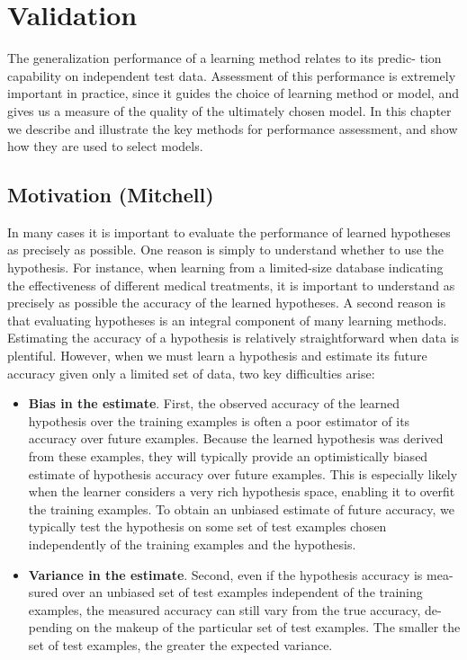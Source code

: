 \documentclass[../main.tex]{subfiles}
\begin{document}
\section{Validation}
The generalization performance of a learning method relates to its predic- tion capability on independent test data. Assessment of this performance is extremely important in practice, since it guides the choice of learning method or model, and gives us a measure of the quality of the ultimately chosen model.
In this chapter we describe and illustrate the key methods for performance assessment, and show how they are used to select models. 

\subsection{Motivation (Mitchell)}
In many cases it is important to evaluate the performance of learned hypotheses as precisely as possible. One reason is simply to understand whether to use the hypothesis. For instance, when learning from a limited-size database indicating the effectiveness of different medical treatments, it is important to understand as precisely as possible the accuracy of the learned hypotheses. A second reason is that evaluating hypotheses is an integral component of many learning methods.\\
Estimating the accuracy of a hypothesis is relatively straightforward when data is plentiful. However, when we must learn a hypothesis and estimate its future accuracy given only a limited set of data, two key difficulties arise:

\begin{itemize}
    \item \textbf{Bias in the estimate}. First, the observed accuracy of the learned hypothesis over the training examples is often a poor estimator of its accuracy over future examples. Because the learned hypothesis was derived from these examples, they will typically provide an optimistically biased estimate of hypothesis accuracy over future examples. This is especially likely when the learner considers a very rich hypothesis space, enabling it to overfit the training examples. To obtain an unbiased estimate of future accuracy, we typically test the hypothesis on some set of test examples chosen independently of the training examples and the hypothesis.
    
    \item \textbf{Variance in the estimate}. Second, even if the hypothesis accuracy is mea- sured over an unbiased set of test examples independent of the training examples, the measured accuracy can still vary from the true accuracy, de- pending on the makeup of the particular set of test examples. The smaller the set of test examples, the greater the expected variance.
\end{itemize}
\end{document}
